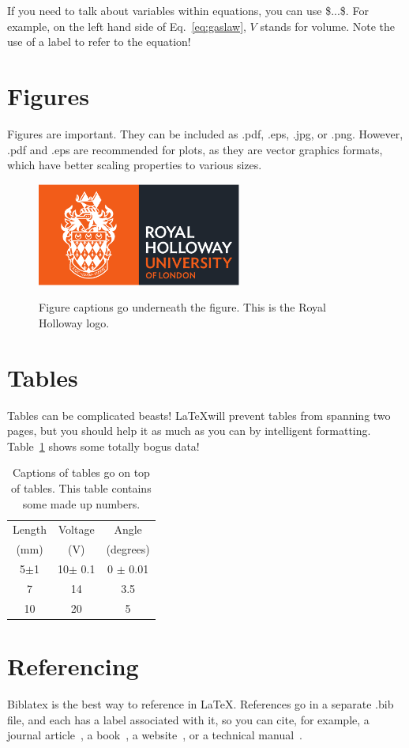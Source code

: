 \documentclass[12pt]{iopart}
\begin{document}
If you need to talk about variables within equations, you can use \$...\$. For example, on the left hand side of Eq.~\ref{eq:gaslaw}, $V$ stands for volume. Note the use of a label to refer to the equation!

\section{Figures}

Figures are important. They can be included as .pdf, .eps, .jpg, or .png.
However, .pdf and .eps are recommended for plots, as they are vector graphics
formats, which have better scaling properties to various sizes. 

\begin{figure}
  \centering
  \includegraphics[width=0.6\textwidth]{logo-large-london-cmyk.pdf}\\
  \caption{Figure captions go underneath the figure. This is the Royal Holloway logo.}
  \label{fig:logo}
\end{figure}


\section{Tables}

Tables can be complicated beasts! \LaTeX will prevent tables from spanning two pages, but you should help it as much as you can by intelligent formatting. Table~\ref{tab:somenumber} shows some totally bogus data!


\begin{table}
  \centering
  \caption{Captions of tables go on top of tables. This table contains some made up numbers.}
  \label{tab:somenumber}
\begin{tabular}{|c|c|c|}
\hline
Length  & Voltage  & Angle \\
(mm) & (V) & (degrees)\\
\hline 
5$\pm$1 & 10$\pm$ 0.1 & 0 $\pm$ 0.01\\
7 & 14 & 3.5\\
10 & 20 & 5\\
\hline
\end{tabular}
\end{table}

\section{Referencing}

Biblatex is the best way to reference in \LaTeX. References go in a separate .bib file, and each has a label associated with it, so you can cite, for example, a journal article~\cite{ahmad2002direct}, a book~\cite{universityphysics}, a website~\cite{Biblatex}, or a technical manual~\cite{PASCO}.


\printbibliography[heading=iophead]
\end{document}
